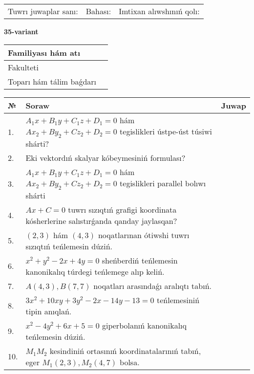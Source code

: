 \documentclass{article}
\begin{document}
\vspace{1cm}

\begin{tabular}{lll}
Tuwrı juwaplar sanı: \underline{\hspace{1.5cm}} & 
Bahası: \underline{\hspace{1.5cm}} & 
Imtixan alıwshınıń qolı: \underline{\hspace{2cm}} \\
\end{tabular}

\egroup

\newpage


\textbf{35-variant}\\

\bgroup
\def\arraystretch{1.6} %

\begin{tabular}{|m{5.7cm}|m{9.5cm}|}
\hline
Familiyası hám atı & \\
\hline
Fakulteti  & \\
\hline
Toparı hám tálim baǵdarı  & \\
\hline
\end{tabular}

\vspace{1cm}

\begin{tabular}{|m{0.7cm}|m{10cm}|m{4cm}|}
\hline
№ & Soraw & Juwap \\
\hline
1. & $A_1x+B_1y+C_1z+D_1=0$ hám $Ax_2+By_2+Cz_2+D_2=0$ tegislikleri ústpe-úst túsiwi shárti? &  \\
\hline
2. & Eki vektordıń skalyar kóbeymesiniń formulası? &  \\
\hline
3. & $A_1x+B_1y+C_1z+D_1=0$ hám $Ax_2+By_2+Cz_2+D_2=0$ tegislikleri parallel bolıwı shárti &  \\
\hline
4. & $Ax+C=0$ tuwrı sızıqtıń grafigi koordinata kósherlerine salıstırǵanda qanday jaylasqan? &  \\
\hline
5. & $(2, 3)$ hám $(4, 3)$ noqatlarınan ótiwshi tuwrı sızıqtıń teńlemesin dúziń. &  \\
\hline
6. & $x^{2}+y^{2}-2x+4y=0$ sheńberdiń teńlemesin kanonikalıq túrdegi teńlemege alıp keliń. &  \\
\hline
7. & $A(4, 3), B(7, 7)$ noqatları arasındaǵı aralıqtı tabıń. &  \\
\hline
8. & $3x^{2}+10xy+3y^{2}-2x-14y-13=0$ teńlemesiniń tipin anıqlań. &  \\
\hline
9. & $x^{2}-4y^{2}+6x+5=0$ giperbolanıń kanonikalıq teńlemesin dúziń. &  \\
\hline
10. & $M_{1}M_{2}$ kesindiniń ortasınıń koordinatalarınıń tabıń, eger $M_{1} (2, 3), M_{2} (4, 7)$ bolsa. &  \\
\hline
\end{tabular}
\end{document}
